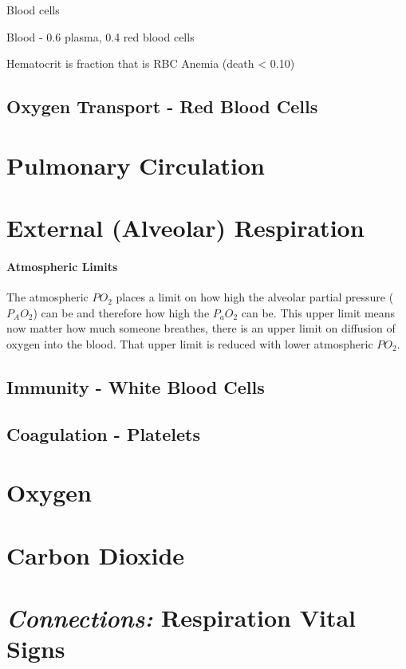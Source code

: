 Blood cells

Blood - 0.6 plasma, 0.4 red blood cells 

Hematocrit is fraction that is RBC
Anemia (death < 0.10)

\subsection{Oxygen Transport - Red Blood Cells}


\section{Pulmonary Circulation}



\section{External (Alveolar) Respiration}



\paragraph{Atmospheric Limits}

The atmospheric $PO_2$ places a limit on how high the alveolar partial pressure ($P_AO_2$) can be and therefore how high the $P_aO_2$ can be. This upper limit means now matter how much someone breathes, there is an upper limit on diffusion of oxygen into the blood. That upper limit is reduced with lower atmospheric $PO_2$.


\subsection{Immunity - White Blood Cells}

\subsection{Coagulation - Platelets}

\section{Oxygen}



\section{Carbon Dioxide}

\section{\textit{Connections:} Respiration Vital Signs}

\printbibliography[heading=subbibintoc]